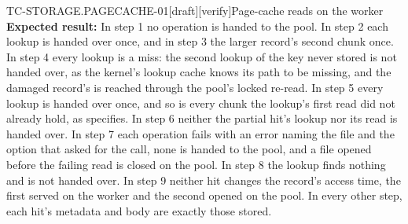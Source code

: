 \begin{requirement}{TC-STORAGE.PAGECACHE-01}[draft][verify]{Page-cache reads on the worker}
  \textbf{Expected result:} In step 1 no operation is handed to the pool. In
  step 2 each lookup is handed over once, and in step 3 the larger record's
  second chunk once. In step 4 every lookup is a miss: the second lookup of
  the key never stored is not handed over, as the kernel's lookup cache
  knows its path to be missing, and the damaged record's is reached through
  the pool's locked re-read. In step 5 every lookup is handed
  over once, and so is every chunk the lookup's first read did not already
  hold, as  specifies. In step 6 neither the
  partial hit's lookup nor its read is handed over. In step 7 each operation
  fails with an error naming the file and the option that asked for the
  call, none is handed to the pool, and a file opened before the failing
  read is closed on the pool. In step 8 the lookup finds nothing and is not
  handed over. In step 9 neither hit changes the record's access time, the
  first served on the worker and the second opened on the pool. In every other step, each hit's metadata and body are exactly
  those stored.



\end{requirement}

